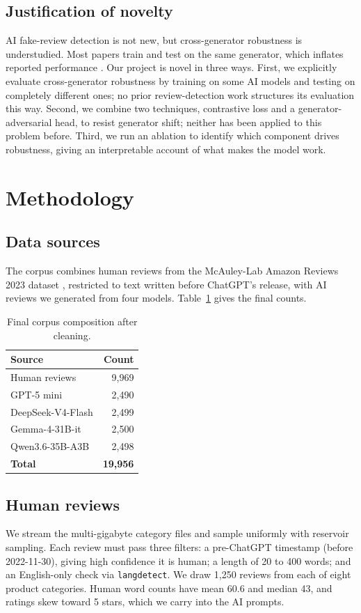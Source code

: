 \documentclass[manuscript,nonacm]{acmart}
\begin{document}
\subsection{Justification of novelty}
AI fake-review detection is not new, but cross-generator robustness is
understudied. Most papers train and test on the same generator, which inflates
reported performance \cite{bag2025,guo2024,kashifpour2025}. Our project is novel
in three ways. First, we explicitly evaluate cross-generator robustness by
training on some AI models and testing on completely different ones; no prior
review-detection work structures its evaluation this way. Second, we combine two
techniques, contrastive loss and a generator-adversarial head, to resist
generator shift; neither has been applied to this problem before. Third, we run
an ablation to identify which component drives robustness, giving an
interpretable account of what makes the model work.

\section{Methodology}

\subsection{Data sources}
The corpus combines human reviews from the McAuley-Lab Amazon Reviews 2023
dataset \cite{amazonreviews2023}, restricted to text written before ChatGPT's
release, with AI reviews we generated from four models. Table~\ref{tab:counts}
gives the final counts.

\begin{table}[H]
\centering
\caption{Final corpus composition after cleaning.}
\label{tab:counts}
\begin{tabular}{lr}
\toprule
Source & Count \\
\midrule
Human reviews & 9{,}969 \\
GPT-5 mini & 2{,}490 \\
DeepSeek-V4-Flash & 2{,}499 \\
Gemma-4-31B-it & 2{,}500 \\
Qwen3.6-35B-A3B & 2{,}498 \\
\midrule
\textbf{Total} & \textbf{19{,}956} \\
\bottomrule
\end{tabular}
\end{table}

\subsection{Human reviews}
We stream the multi-gigabyte category files and sample uniformly with reservoir
sampling. Each review must pass three filters: a pre-ChatGPT timestamp (before
2022-11-30), giving high confidence it is human; a length of 20 to 400 words;
and an English-only check via \texttt{langdetect}. We draw 1{,}250 reviews from
each of eight product categories. Human word counts have mean 60.6 and median
43, and ratings skew toward 5 stars, which we carry into the AI prompts.
\end{document}
